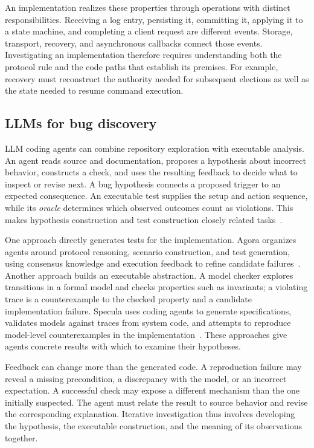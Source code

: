 \documentclass[10pt,twocolumn,letterpaper]{article}
\begin{document}
An implementation realizes these properties through operations with distinct responsibilities. Receiving a log entry, persisting it, committing it, applying it to a state machine, and completing a client request are different events. Storage, transport, recovery, and asynchronous callbacks connect those events. Investigating an implementation therefore requires understanding both the protocol rule and the code paths that establish its premises. For example, recovery must reconstruct the authority needed for subsequent elections as well as the state needed to resume command execution.

\subsection{LLMs for bug discovery}

LLM coding agents can combine repository exploration with executable analysis. An agent reads source and documentation, proposes a hypothesis about incorrect behavior, constructs a check, and uses the resulting feedback to decide what to inspect or revise next. A bug hypothesis connects a proposed trigger to an expected consequence. An executable test supplies the setup and action sequence, while its \emph{oracle} determines which observed outcomes count as violations. This makes hypothesis construction and test construction closely related tasks~\cite{agora}.

One approach directly generates tests for the implementation. Agora organizes agents around protocol reasoning, scenario construction, and test generation, using consensus knowledge and execution feedback to refine candidate failures~\cite{agora}. Another approach builds an executable abstraction. A model checker explores transitions in a formal model and checks properties such as invariants; a violating trace is a counterexample to the checked property and a candidate implementation failure. Specula uses coding agents to generate specifications, validates models against traces from system code, and attempts to reproduce model-level counterexamples in the implementation~\cite{specula}. These approaches give agents concrete results with which to examine their hypotheses.

Feedback can change more than the generated code. A reproduction failure may reveal a missing precondition, a discrepancy with the model, or an incorrect expectation. A successful check may expose a different mechanism than the one initially suspected. The agent must relate the result to source behavior and revise the corresponding explanation. Iterative investigation thus involves developing the hypothesis, the executable construction, and the meaning of its observations together.
\end{document}
